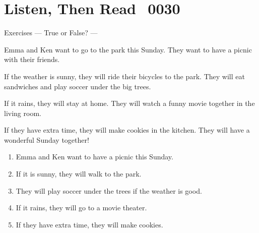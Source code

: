 \documentclass[aspectratio=169,xcolor={dvipsnames,table}]{beamer}
\begin{document}
\section{Listen, Then Read\,\,\,\,\,{\tiny 0030}\,{\scriptsize {}}}
\begin{frame}[plain,t]{Exercises --- True or False? ---}
\vspace*{-8pt}
\begin{tcolorbox}[colframe=ForestGreen,
  colback=NavyBlue!10!white,
  colbacktitle=NavyBlue!40!white,
  coltitle=black, %
before upper={\setlength{\parindent}{1.25em}},
 title={Planning a Sunday Picnic\hfill{\tiny 0030}\quad{\scriptsize \myaudio{./audio/022_if_reading.mp3}}}
]
\vspace{-1pt}
\noindent{}Emma and Ken want to go to the park this Sunday.
They want to have a picnic with their friends.

If the weather is sunny, they will ride their bicycles to the park.
They will eat sandwiches and play soccer under the big trees.

If it rains, they will stay at home.
They will watch a funny movie together in the living room.

If they have extra time, they will make cookies in the kitchen.
They will have a wonderful Sunday together!
\end{tcolorbox}

\vspace{-7pt}
\begin{enumerate}\setlength{\itemsep}{-3.3pt}
\item<2-> Emma and Ken want to have a picnic this Sunday.\hfill{}
\item<2-> If it is sunny, they will walk to the park.\hfill{}
\item<2-> They will play soccer under the trees if the weather is good.\hfill{}
\item<2-> If it rains, they will go to a movie theater.\hfill{}
\item<2-> If they have extra time, they will make cookies.\hfill{}
\end{enumerate}
\end{frame}
\end{document}
